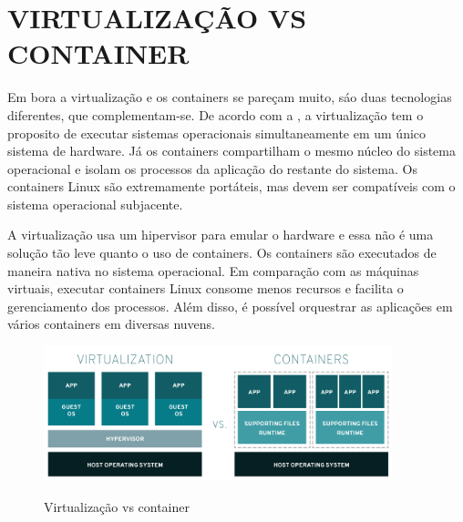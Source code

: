 \section{VIRTUALIZAÇÃO VS CONTAINER}
\label{sec:virtualizaçãos-vs-container}

Em bora a virtualização e os containers se pareçam muito, sáo duas tecnologias diferentes, que complementam-se. De acordo com a , a virtualização tem o proposito de executar sistemas operacionais simultaneamente em um único sistema de hardware. Já os containers compartilham o mesmo núcleo do sistema operacional e isolam os processos da aplicação do restante do sistema. Os containers Linux são extremamente portáteis, mas
devem ser compatíveis com o sistema operacional subjacente.

A virtualização usa um hipervisor para emular o hardware e essa não é uma solução tão leve quanto o uso de containers. Os containers são executados de maneira nativa no sistema operacional. Em comparação com as máquinas virtuais, executar containers Linux consome menos recursos e facilita o gerenciamento dos processos. Além
disso, é possível orquestrar as aplicações em vários containers em diversas nuvens.

\begin{figure}[!htb] 
	\centering
	\caption{Virtualização vs container}
	\includegraphics[width=0.9\textwidth]{figuras/virtualization-vs-containers.png}
	\label{fig:virtualization-vs-containers}
\end{figure}






